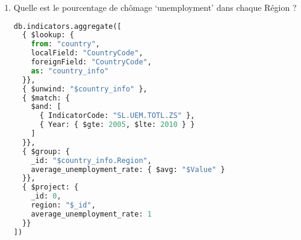 \begin{enumerate}
Malheureusement, MongoDB n'a pas de fonction native pour calculer le taux de croissance annuel moyen (CAGR). Cela nécessite donc de créer une fonction personnalisée pour effectuer le calcul. On va ainsi écrire une requête en MongoDB qui utilise une fonction personnalisée pour calculer la croissance annuelle moyenne du GDP pour les pays de l'OCDE par rapport à l'année 2010. 
\begin{lstlisting}
db.country.aggregate([
  // jointure avec la table des indicateurs
  {
    $lookup: {
      from: "indicators",
      localField: "CountryCode",
      foreignField: "CountryCode",
      as: "indicators"
    }
  },
  // filtrage sur les pays de l'OCDE
  {
    $match: {
      IncomeGroup: "High income: OECD"
    }
  },
  // projection des attributs nécessaires
  {
    $project: {
      _id: 0,
      CountryName: 1,
      GDP_2010: {
        $arrayElemAt: [
          {
            $filter: {
              input: "$indicators",
              as: "indicator",
              cond: {
                $and: [
                  { $eq: ["$$indicator.IndicatorName", "GDP per capita"] },
                  { $eq: ["$$indicator.Year", 2010] }
                ]
              }
            }
          },
          0
        ]
      },
      GDP_2019: {
        $arrayElemAt: [
          {
            $filter: {
              input: "$indicators",
              as: "indicator",
              cond: {
                $and: [
                  { $eq:["$$indicator.IndicatorName", "GDP per capita"] },
                  { $eq: ["$$indicator.Year", 2019] }
                ]
              }
            }
          },
          0
        ]
      }
    }
  },
  // calcul de la croissance annuelle moyenne
  {
    $addFields: {
      CAGR: {
        $pow: [
          { $divide: [{ $getGDP: "$GDP_2019.Value" }, 
          { $getGDP: "$GDP_2010.Value" }] },
          { $divide: [1, 9] }
        ]
      }
    }
  },
  {
    $sort: {
      CAGR: -1
    }
  }
])

\end{lstlisting}
    \item Quelle est le pourcentage de chômage ‘unemployment’ dans chaque Région ?

\begin{lstlisting}[language=Python]
db.indicators.aggregate([
  { $lookup: {
    from: "country",
    localField: "CountryCode",
    foreignField: "CountryCode",
    as: "country_info"
  }},
  { $unwind: "$country_info" },
  { $match: {
    $and: [
      { IndicatorCode: "SL.UEM.TOTL.ZS" }, 
      { Year: { $gte: 2005, $lte: 2010 } } 
    ]
  }},
  { $group: {
    _id: "$country_info.Region",
    average_unemployment_rate: { $avg: "$Value" }
  }},
  { $project: {
    _id: 0,
    region: "$_id",
    average_unemployment_rate: 1
  }}
])


\end{lstlisting}
\end{enumerate}
